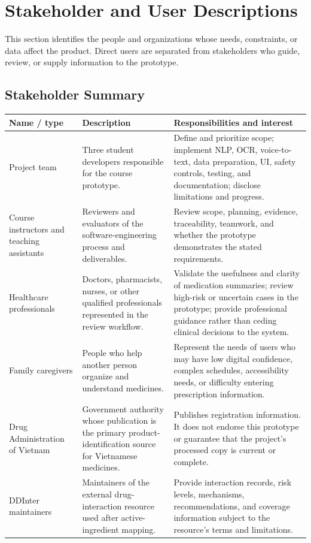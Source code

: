 \section{Stakeholder and User Descriptions}

This section identifies the people and organizations whose needs, constraints,
or data affect the product. Direct users are separated from stakeholders who
guide, review, or supply information to the prototype.

\subsection{Stakeholder Summary}

\begin{longtable}{|L{0.20\textwidth}|L{0.27\textwidth}|L{0.43\textwidth}|}
\hline
\textbf{Name / type} & \textbf{Description} & \textbf{Responsibilities and interest}\\ \hline
Project team & Three student developers responsible for the course prototype. & Define and prioritize scope; implement NLP, OCR, voice-to-text, data preparation, UI, safety controls, testing, and documentation; disclose limitations and progress.\\ \hline
Course instructors and teaching assistants & Reviewers and evaluators of the software-engineering process and deliverables. & Review scope, planning, evidence, traceability, teamwork, and whether the prototype demonstrates the stated requirements.\\ \hline
Healthcare professionals & Doctors, pharmacists, nurses, or other qualified professionals represented in the review workflow. & Validate the usefulness and clarity of medication summaries; review high-risk or uncertain cases in the prototype; provide professional guidance rather than ceding clinical decisions to the system.\\ \hline
Family caregivers & People who help another person organize and understand medicines. & Represent the needs of users who may have low digital confidence, complex schedules, accessibility needs, or difficulty entering prescription information.\\ \hline
Drug Administration of Vietnam & Government authority whose publication is the primary product-identification source for Vietnamese medicines. & Publishes registration information. It does not endorse this prototype or guarantee that the project's processed copy is current or complete.\\ \hline
DDInter maintainers & Maintainers of the external drug-interaction resource used after active-ingredient mapping. & Provide interaction records, risk levels, mechanisms, recommendations, and coverage information subject to the resource's terms and limitations.\\ \hline
\end{longtable}

